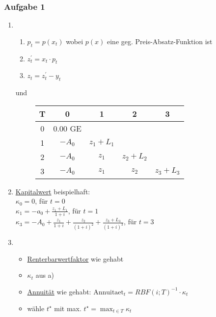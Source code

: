 	\subsubsection*{Aufgabe 1}
	\begin{enumerate}[label=\alph*)]
		\item \begin{enumerate}
				\item $p_t=p(x_t)$ wobei $p(x)$ eine geg. Preis-Absatz-Funktion ist
				\item $z_t^\prime=x_t\cdot p_t$
				\item $z_t=z_t^\prime-y_t$
			\end{enumerate} 
			und \\
			\begin{figure}[H]
				\centering
				\begin{tabular}{|c|c|c|c|c|}
					\hline
					\textbf{T}  & \textbf{0} & \textbf{1} & \textbf{2}  & \textbf{3}\\ \hline
					0          & 0.00 GE     &             &            &   \\
					1          & $-A_0$     & $z_1 + L_1$ &            &  \\			
					2          & $-A_0$     & $z_1$       & $z_2 + L_2$&  \\			
					3          & $-A_0$     & $z_1$       & $z_2$& $z_3+L_3$ \\
					\hline
				\end{tabular}
			\end{figure}
		\item \hyperref[Kapitalwert]{Kapitalwert} beispielhaft:\\
		$\kappa_0=0$, für $t=0$\\
		$\kappa_1=-a_0 + \frac{z_1+L_1}{1+i}$, für $t=1$ \\ $\kappa_3=-A_0+\frac{z_1}{1+i}+\frac{z_2}{(1+i)^2}+\frac{z_3+L_3}{(1+i)^3}$, für $t=3$
		\item \begin{itemize}
				\item \hyperref[Rentenbarwertfaktor]{Renterbarwertfaktor} wie gehabt
				\item $\kappa_t$ aus a)
				\item \hyperref[Annuitaet]{Annuität} wie gehabt: $\text{Annuitaet}_t = RBF(i;T)^{-1}\cdot \kappa_t$
				\item wähle $t^\star$ mit max. $t^\star= \max_{t\in T} \kappa_t$
			\end{itemize}
	\end{enumerate}
	
	